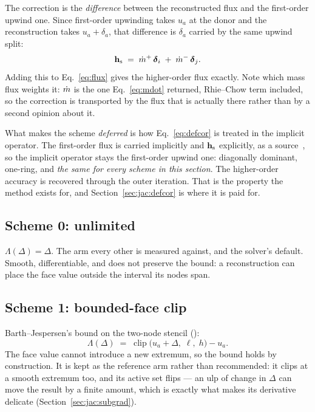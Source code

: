 The correction is the \emph{difference} between the reconstructed flux and the first-order upwind
one. Since first-order upwinding takes $u_a$ at the donor and the reconstruction takes
$u_a + \delta_a$, that difference is $\delta_a$ carried by the same upwind split:
\begin{equation}
\mathbf{h}_{\mathrm{s}} \;=\; \dot{m}^{+}\,\boldsymbol{\delta}_i \;+\; \dot{m}^{-}\,\boldsymbol{\delta}_j .
\label{eq:defcor}
\end{equation}
Adding this to Eq.~\eqref{eq:flux} gives the higher-order flux exactly. Note which mass flux
weights it: $\dot{m}$ is the one Eq.~\eqref{eq:mdot} returned, Rhie--Chow term included, so the
correction is transported by the flux that is actually there rather than by a second opinion
about it.

What makes the scheme \emph{deferred} is how Eq.~\eqref{eq:defcor} is treated in the implicit
operator. The first-order flux is carried implicitly and $\mathbf{h}_{\mathrm{s}}$ explicitly, as a
source~\cite{KhoslaRubin1974,XuePhanThienTanner2002}, so the implicit operator stays the
first-order upwind one: diagonally dominant, one-ring, and \emph{the same for every scheme in
this section}. The higher-order accuracy is recovered through the outer iteration. That is the
property the method exists for, and Section~\ref{sec:jac:defcor} is where it is paid for.

\subsection{Scheme 0: unlimited}

$\Lambda(\Delta) = \Delta$. The arm every other is measured against, and the solver's default.
Smooth, differentiable, and does not preserve the bound: a reconstruction can place the face value
outside the interval its nodes span.

\subsection{Scheme 1: bounded-face clip}

Barth--Jespersen's bound on the two-node stencil
():
\begin{equation}
\Lambda(\Delta) \;=\; \operatorname{clip}\bigl(u_a + \Delta,\; \ell,\; h\bigr) - u_a .
\end{equation}
The face value cannot introduce a new extremum, so the bound holds by construction. It is kept as
the reference arm rather than recommended: it clips at a smooth extremum too, and its active set
flips --- an ulp of change in $\Delta$ can move the result by a finite amount, which is exactly
what makes its derivative delicate (Section~\ref{sec:jac:subgrad}).

